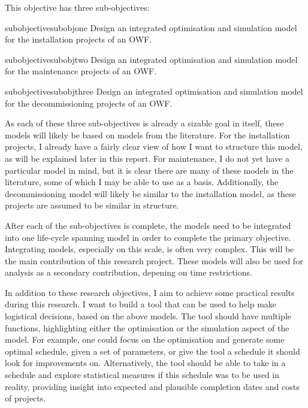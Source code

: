 \documentclass[a4paper,12pt]{article}
\begin{document}
This objective has three sub-objectives:

\begin{restatable}{subobjective}{subobjone}
\label{subobjone}
Design an integrated optimisation and simulation model for the installation projects of an OWF. 
\end{restatable}

\begin{restatable}{subobjective}{subobjtwo}
\label{subobjtwo}
Design an integrated optimisation and simulation model for the maintenance projects of an OWF. 
\end{restatable}

\begin{restatable}{subobjective}{subobjthree}
\label{subobjthree}
Design an integrated optimisation and simulation model for the decommissioning projects of an OWF. 
\end{restatable}

As each of these three sub-objectives is already a sizable goal in itself, these models will likely be based on models from the literature. For the installation projects, I already have a fairly clear view of how I want to structure this model, as will be explained later in this report. For maintenance, I do not yet have a particular model in mind, but it is clear there are many of these models in the literature, some of which I may be able to use as a basis. Additionally, the decommissioning model will likely be similar to the installation model, as these projects are assumed to be similar in structure. 

After each of the sub-objectives is complete, the models need to be integrated into one life-cycle spanning model in order to complete the primary objective. Integrating models, especially on this scale, is often very complex. This will be the main contribution of this research project. These models will also be used for analysis as a secondary contribution, depening on time restrictions.

\bigskip

In addition to these research objectives, I aim to achieve some practical results during this research. I want to build a tool that can be used to help make logistical decisions, based on the above models. The tool should have multiple functions, highlighting either the optimisation or the simulation aspect of the model. For example, one could focus on the optimisation and generate some optimal schedule, given a set of parameters, or give the tool a schedule it should look for improvements on. Alternatively, the tool should be able to take in a schedule and explore statistical measures if this schedule was to be used in reality, providing insight into expected and plausible completion dates and costs of projects. 
\end{document}
